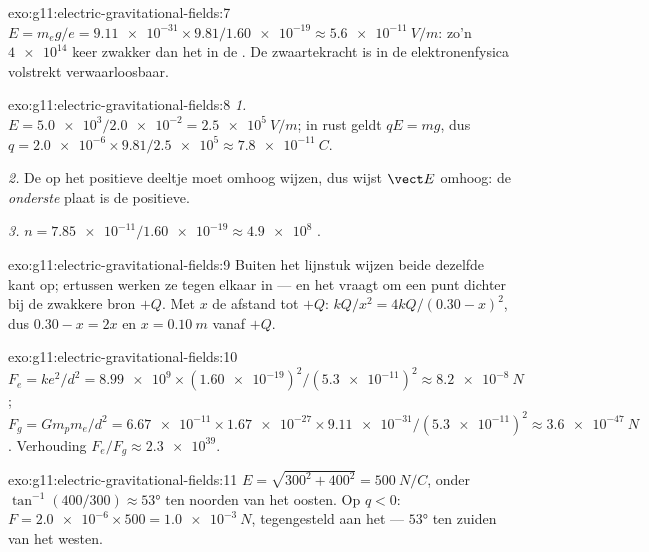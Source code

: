 \begin{solution}{exo:g11:electric-gravitational-fields:7}
$E = m_e g / e = \num{9.11e-31} \times 9.81 / \num{1.60e-19}
\approx \qty{5.6e-11}{V/m}$: zo'n $\num{4e14}$ keer zwakker dan het 
in de . De zwaartekracht is in de elektronenfysica volstrekt
verwaarloosbaar.
\end{solution}

\begin{solution}{exo:g11:electric-gravitational-fields:8}
\emph{1.} $E = \num{5.0e3} / \num{2.0e-2} = \qty{2.5e5}{V/m}$; in rust
geldt $qE = mg$, dus
$q = \num{2.0e-6} \times 9.81 / \num{2.5e5} \approx \qty{7.8e-11}{C}$.

\emph{2.} De  op het positieve deeltje moet omhoog wijzen, dus
wijst $\vect E$ omhoog: de \emph{onderste} plaat is de positieve.

\emph{3.} $n = \num{7.85e-11} / \num{1.60e-19} \approx \num{4.9e8}$
.
\end{solution}

\begin{solution}{exo:g11:electric-gravitational-fields:9}
Buiten het lijnstuk wijzen beide  dezelfde kant op; ertussen werken
ze tegen elkaar in --- en het  vraagt om een punt dichter bij de
zwakkere bron $+Q$. Met $x$ de afstand tot $+Q$:
$kQ/x^2 = 4kQ/(0.30 - x)^2$, dus $0.30 - x = 2x$ en $x = \qty{0.10}{m}$
vanaf $+Q$.
\end{solution}

\begin{solution}{exo:g11:electric-gravitational-fields:10}
$F_e = ke^2/d^2 = \num{8.99e9} \times (\num{1.60e-19})^2 /
(\num{5.3e-11})^2 \approx \qty{8.2e-8}{N}$;
$F_g = G m_p m_e / d^2 = \num{6.67e-11} \times \num{1.67e-27} \times
\num{9.11e-31} / (\num{5.3e-11})^2 \approx \qty{3.6e-47}{N}$.
Verhouding $F_e / F_g \approx \num{2.3e39}$.
\end{solution}

\begin{solution}{exo:g11:electric-gravitational-fields:11}
$E = \sqrt{300^2 + 400^2} = \qty{500}{N/C}$, onder
$\tan^{-1}(400/300) \approx \ang{53}$ ten noorden van het oosten. Op
$q < 0$: $F = \num{2.0e-6} \times 500 = \qty{1.0e-3}{N}$, tegengesteld
aan het  --- $\ang{53}$ ten zuiden van het westen.
\end{solution}

